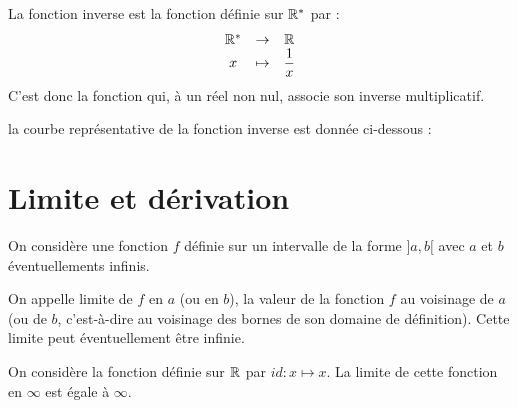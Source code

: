 \documentclass[a4paper, 12pt]{report}
\begin{document}
\begin{defn}
La fonction inverse est la fonction définie sur $\mathbb{R}^{\ast}$ par :
\[ \begin{array}{c c c}
\mathbb{R}^{\ast} & \to & \mathbb{R} \\
x & \mapsto & \dfrac1{x}
\end{array} \] 
C'est donc la fonction qui, à un réel non nul, associe son inverse multiplicatif.
\end{defn}

\begin{rmq}
la courbe représentative de la fonction inverse est donnée ci-dessous :

\begin{center}
\end{center}

\end{rmq}

\section{Limite et dérivation}

\begin{defn}[Limite]
On considère une fonction $f$ définie sur un intervalle de la forme $]a,b[$ avec $a$ et $b$ éventuellements infinis. \newline

On appelle limite de $f$ en $a$ (ou en $b$), la valeur de la fonction $f$ au voisinage de $a$ (ou de $b$, 
c'est-à-dire au voisinage des bornes de son domaine de définition).
Cette limite peut éventuellement être infinie.
\end{defn}

\begin{ex}
On considère la fonction définie sur $\mathbb{R}$ par  $id : x \mapsto x$. La limite de cette fonction en $\infty$ est égale à $\infty$.
\end{ex}
\end{document}
